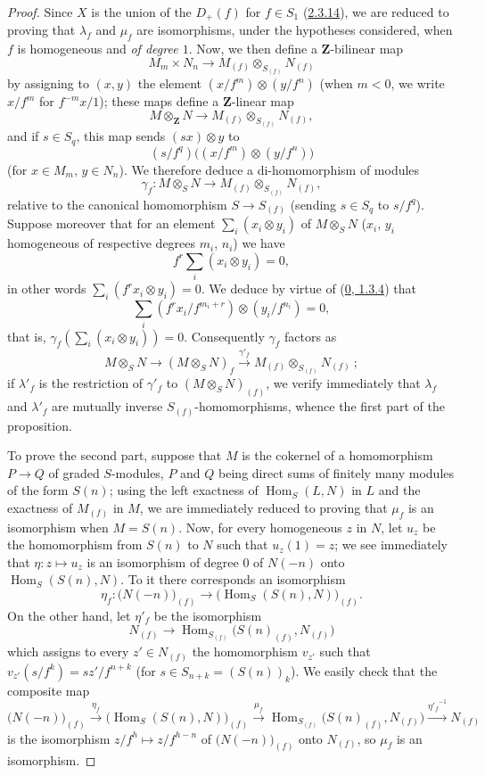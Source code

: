 \begin{proof}
Since $X$ is the union of the $D_+(f)$ for $f\in S_1$
(\hyperref[II.2.3.14]{2.3.14}), we are reduced to proving that
$\lambda_f$ and $\mu_f$ are isomorphisms, under the hypotheses considered,
when $f$ is homogeneous and \emph{of degree $1$}. Now, we then define a
$\mathbf{Z}$-bilinear map
\[
  M_m\times N_n\longrightarrow
  M_{(f)}\otimes_{S_{(f)}}N_{(f)}
\]
by assigning to $(x,y)$ the element
$(x/f^m)\otimes(y/f^n)$ (when $m<0$, we write $x/f^m$ for
$f^{-m}x/1$); these maps define a
$\mathbf{Z}$-linear map
\[
  M\otimes_{\mathbf{Z}}N\longrightarrow
  M_{(f)}\otimes_{S_{(f)}}N_{(f)},
\]
and if $s\in S_q$, this map sends $(sx)\otimes y$ to
\[
  (s/f^q)\bigl((x/f^m)\otimes(y/f^n)\bigr)
\]
(for $x\in M_m$, $y\in N_n$). We therefore deduce a di-homomorphism of
modules
\[
  \gamma_f:M\otimes_S N\longrightarrow
  M_{(f)}\otimes_{S_{(f)}}N_{(f)},
\]
relative to the canonical homomorphism $S\to S_{(f)}$ (sending
$s\in S_q$ to $s/f^q$). Suppose moreover that for an element
$\sum_i(x_i\otimes y_i)$ of $M\otimes_S N$ ($x_i$, $y_i$ homogeneous of
respective degrees $m_i$, $n_i$) we have
\[
  f^r\sum_i(x_i\otimes y_i)=0,
\]
in other words $\sum_i(f^rx_i\otimes y_i)=0$. We deduce by virtue of
(\hyperref[0.1.3.4]{0, 1.3.4}) that
\[
  \sum_i(f^rx_i/f^{m_i+r})\otimes(y_i/f^{n_i})=0,
\]
that is, $\gamma_f(\sum_i(x_i\otimes y_i))=0$. Consequently $\gamma_f$
factors as
\[
  M\otimes_S N\longrightarrow(M\otimes_S N)_f
  \xrightarrow{\gamma'_f}
  M_{(f)}\otimes_{S_{(f)}}N_{(f)}~;
\]
if $\lambda'_f$ is the restriction of $\gamma'_f$
to $(M\otimes_S N)_{(f)}$, we verify immediately that $\lambda_f$ and
$\lambda'_f$ are mutually inverse $S_{(f)}$-homomorphisms, whence the
first part of the proposition.

To prove the second part, suppose that $M$ is the cokernel of a
homomorphism $P\to Q$ of graded $S$-modules, $P$ and $Q$ being direct
sums of finitely many modules of the form $S(n)$; using
the left exactness of $\operatorname{Hom}_S(L,N)$ in $L$ and the exactness
of $M_{(f)}$ in $M$, we are immediately reduced to proving that $\mu_f$ is
an isomorphism when $M=S(n)$. Now, for every homogeneous $z$ in $N$, let
$u_z$ be the homomorphism from $S(n)$ to $N$ such that $u_z(1)=z$; we see
immediately that $\eta:z\mapsto u_z$ is an isomorphism of degree $0$ of
$N(-n)$ onto $\operatorname{Hom}_S(S(n),N)$. To it there corresponds an
isomorphism
\[
  \eta_f:\bigl(N(-n)\bigr)_{(f)}
  \longrightarrow
  \bigl(\operatorname{Hom}_S(S(n),N)\bigr)_{(f)}.
\]
On the other hand, let $\eta'_f$ be the isomorphism
\[
  N_{(f)}\longrightarrow
  \operatorname{Hom}_{S_{(f)}}\bigl(S(n)_{(f)},N_{(f)}\bigr)
\]
which assigns to every $z'\in N_{(f)}$ the homomorphism $v_{z'}$ such
that $v_{z'}(s/f^k)=sz'/f^{n+k}$ (for
$s\in S_{n+k}=(S(n))_k$). We easily check that the composite map
\[
  \bigl(N(-n)\bigr)_{(f)}
  \xrightarrow{\eta_f}
  \bigl(\operatorname{Hom}_S(S(n),N)\bigr)_{(f)}
  \xrightarrow{\mu_f}
  \operatorname{Hom}_{S_{(f)}}\bigl(S(n)_{(f)},N_{(f)}\bigr)
  \xrightarrow{{\eta'_f}^{-1}}N_{(f)}
\]
is the isomorphism $z/f^h\mapsto z/f^{h-n}$ of
$\bigl(N(-n)\bigr)_{(f)}$ onto $N_{(f)}$, so $\mu_f$ is an isomorphism.
\end{proof}

